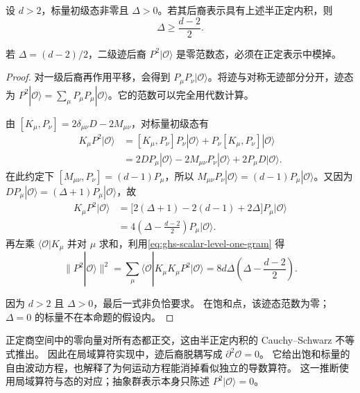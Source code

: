 \begin{theorem}[标量的必要幺正性界]
设 $d>2$，标量初级态非零且 $\Delta>0$。若其后裔表示具有上述半正定内积，则
\begin{equation}\label{eq:ghs-scalar-unitarity-bound}
 \Delta\ge\frac{d-2}{2}.
\end{equation}

若 $\Delta=(d-2)/2$，二级迹后裔 $P^2|\mathcal O\rangle$ 是零范数态，必须在正定表示中模掉。
\end{theorem}
\begin{proof}
对一级后裔再作用平移，会得到 $P_\mu P_\nu|\mathcal O\rangle$。将迹与对称无迹部分分开，迹态为 $P^2|\mathcal O\rangle=\sum_\mu P_\mu P_\mu|\mathcal O\rangle$。它的范数可以完全用代数计算。


 由 $[K_\mu,P_\nu]=2\delta_{\mu\nu}D-2M_{\mu\nu}$，对标量初级态有
 \begin{align*}
 K_\mu P^2|\mathcal O\rangle
 &=[K_\mu,P_\nu]P_\nu|\mathcal O\rangle
   +P_\nu[K_\mu,P_\nu]|\mathcal O\rangle\\
 &=2D P_\mu|\mathcal O\rangle
   -2M_{\mu\nu}P_\nu|\mathcal O\rangle
   +2P_\mu D|\mathcal O\rangle.
 \end{align*}
 在此约定下 $[M_{\mu\nu},P_\nu]=(d-1)P_\mu$，所以 $M_{\mu\nu}P_\nu|\mathcal O\rangle=(d-1)P_\mu|\mathcal O\rangle$。又因为 $DP_\mu|\mathcal O\rangle=(\Delta+1)P_\mu|\mathcal O\rangle$，故
 \begin{align*}
 K_\mu P^2|\mathcal O\rangle
 &=\bigl[2(\Delta+1)-2(d-1)+2\Delta\bigr]P_\mu|\mathcal O\rangle\\
 &=4\left(\Delta-\frac{d-2}{2}\right)P_\mu|\mathcal O\rangle.
 \end{align*}
 再左乘 $\langle\mathcal O|K_\mu$ 并对 $\mu$ 求和，利用\cref{eq:ghs-scalar-level-one-gram} 得
 \begin{equation*}
 \|P^2|\mathcal O\rangle\|^2
 =\sum_\mu\langle\mathcal O|K_\mu K_\mu P^2|\mathcal O\rangle
 =8d\Delta\left(\Delta-\frac{d-2}{2}\right).
 \end{equation*}

因为 $d>2$ 且 $\Delta>0$，最后一式非负恰要求。
在饱和点，该迹态范数为零；$\Delta=0$ 的标量不在本命题的假设内。
\end{proof}

正定商空间中的零向量对所有态都正交，这由半正定内积的 Cauchy--Schwarz 不等式推出。
因此在局域算符实现中，迹后裔脱耦写成 $\partial^2\mathcal O=0$。
它给出饱和标量的自由波动方程，也解释了为何运动方程能消掉看似独立的导数算符。
这一推断使用局域算符与态的对应；抽象群表示本身只陈述 $P^2|\mathcal O\rangle=0$。

